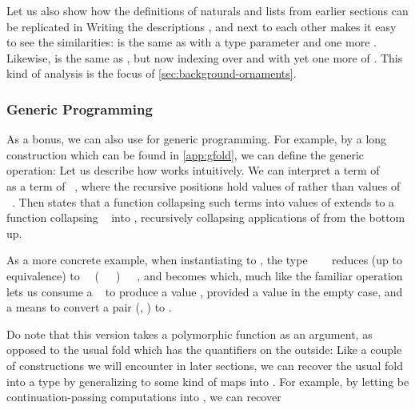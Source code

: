 Let us also show how the definitions of naturals and lists from earlier sections can be replicated in 
Writing the descriptions ,  and  next to each other makes it easy to see the similarities:  is the same as  with a type parameter and one more . Likewise,  is the same as , but now indexing over \bN{} and with yet one more  of \bN{}. This kind of analysis is the focus of \autoref{sec:background-ornaments}.

\subsubsection{Generic Programming}
As a bonus, we can also use  for generic programming. For example, by a long construction which can be found in \autoref{app:gfold}, we can define the generic  operation:
Let us describe how  works intuitively. We can interpret a term of \ \ \  as a term of \ , where the recursive positions hold values of  rather than values of \ . Then  states that a function collapsing such terms into values of  extends to a function collapsing \  into , recursively collapsing applications of  from the bottom up.

As a more concrete example, when instantiating  to , the type \ \ \  reduces (up to equivalence) to \ \ (\ \ \ )\ \ \ , and  becomes
which, much like the familiar  operation lets us consume a \  to produce a value , provided a value  in the empty case, and a means to convert a pair (, ) to .

Do note that this version takes a polymorphic function as an argument, as opposed to the usual fold which has the quantifiers on the outside:
Like a couple of constructions we will encounter in later sections, we can recover the usual fold into a type  by generalizing  to some kind of maps into . For example, by letting  be continuation-passing computations into \bN{}, we can recover


